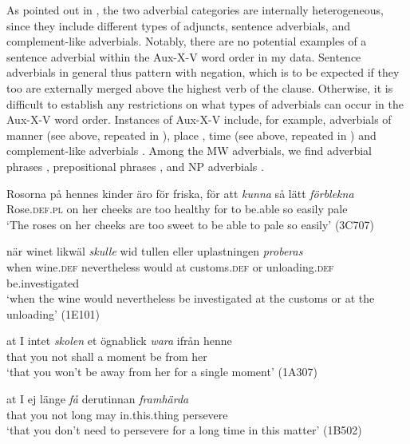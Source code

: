 \documentclass[output=paper, colorlinks, citecolor=brown]{langscibook}
\begin{document}
As pointed out in , the two adverbial categories are internally heterogeneous, since they include different types of adjuncts, sentence adverbials, and complement-like adverbials. Notably, there are no potential examples of a sentence adverbial within the Aux-X-V word order in my data. Sentence adverbials in general thus pattern with negation, which is to be expected if they too are externally merged above the highest verb of the clause. Otherwise, it is difficult to establish any restrictions on what types of adverbials can occur in the Aux-X-V word order. Instances of Aux-X-V include, for example, adverbials of manner (see  above, repeated in ), place , time (see  above, repeated in ) and complement-like adverbials . Among the MW adverbials, we find adverbial phrases , prepositional phrases , and NP adverbials .


\ea
\label{ex:sangfelt:26}
\ea \label{ex:sangfelt:26a}
\gll Rosorna på hennes kinder äro för friska, för att \textit{kunna} {så} {lätt} \textit{förblekna}\\ %
 Rose.\textsc{def.pl} on her cheeks are too healthy for to be.able so easily pale\\
\glt ‘The roses on her cheeks are too sweet to be able to pale so easily’ (3C707)

\ex\label{ex:sangfelt:26b}
\gll när winet likwäl \textit{skulle} {wid} {tullen} {eller} {uplastningen} \textit{proberas}\\
 when wine.\textsc{def} nevertheless would at customs.\textsc{def} or unloading.\textsc{def} be.investigated\\
\glt ‘when the wine would nevertheless be investigated at the customs or at the unloading’ (1E101)

\ex\label{ex:sangfelt:26c}
\gll at I intet \textit{skolen} {et} {ögnablick} \textit{wara} ifrån henne \\
 that you not shall a moment be from her\\
\glt ‘that you won’t be away from her for a single moment’ (1A307)

\ex\label{ex:sangfelt:26d}
\gll at I ej länge \textit{få} {derutinnan} \textit{framhärda} \\
 that you not long may in.this.thing persevere\\
\glt ‘that you don’t need to persevere for a long time in this matter’ (1B502)
\z
\z 
\end{document}
